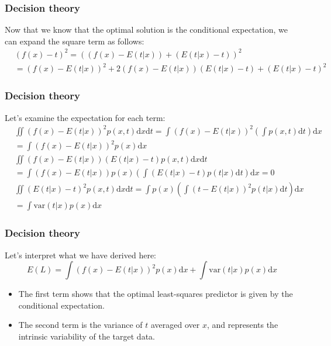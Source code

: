 \documentclass{beamer}
\begin{document}
\begin{frame}
    \frametitle{Decision theory}
    Now that we know that the optimal solution is the conditional expectation, we can expand the square term as follows:
    \begin{align*}
        &(f(x)-t)^{2}=((f(x)-E(t|x))+(E(t|x)-t))^{2} \\
        &=(f(x)-E(t|x))^{2}+2(f(x)-E(t|x))(E(t|x)-t)+(E(t|x)-t)^{2}
    \end{align*}
\end{frame}

\begin{frame}
    \frametitle{Decision theory}
    Let's examine the expectation for each term:
    \begin{align*}
        &\iint(f(x)-E(t|x))^{2}p(x,t)\mathrm{d}x\mathrm{d}t=\int(f(x)-E(t|x))^{2}(\int{}p(x,t)\mathrm{d}t)\mathrm{d}x \\
        &=\int(f(x)-E(t|x))^{2}p(x)\mathrm{d}x \\
        &\iint(f(x)-E(t|x))(E(t|x)-t)p(x,t)\mathrm{d}x\mathrm{d}t \\
        &=\int(f(x)-E(t|x))p(x)(\int(E(t|x)-t)p(t|x)\mathrm{d}t)\mathrm{d}x=0 \\
        &\iint(E(t|x)-t)^{2}p(x,t)\mathrm{d}x\mathrm{d}t=\int{}p(x)(\int(t-E(t|x))^{2}p(t|x)\mathrm{d}t)\mathrm{d}x \\
        &=\int\mathrm{var}(t|x)p(x)\mathrm{d}x
    \end{align*}
\end{frame}

\begin{frame}
    \frametitle{Decision theory}
    Let's interpret what we have derived here:
    \begin{equation*}
        E(L)=\int(f(x)-E(t|x))^{2}p(x)\mathrm{d}x+\int\mathrm{var}(t|x)p(x)\mathrm{d}x
    \end{equation*}
    \begin{itemize}
        \item The first term shows that the optimal least-squares predictor is given by the conditional expectation.
        \item The second term is the variance of $t$ averaged over $x$, and represents the intrinsic variability of the target data.
    \end{itemize}
\end{frame}
\end{document}
